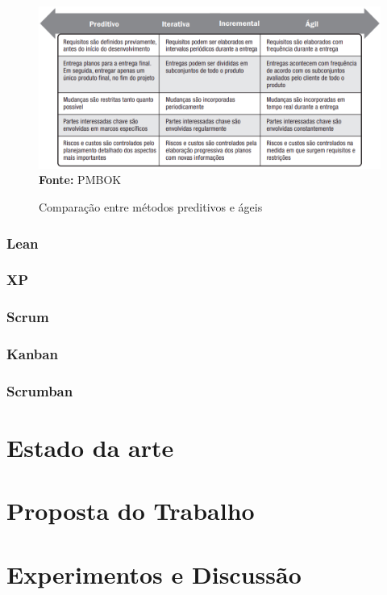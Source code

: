 \documentclass[
    12pt,       %
    openright,      %
    twoside,      %
    a4paper,      %
    english,      %
    french,       %
    spanish,      %
    brazil,       %
    ]{abntex2}
\begin{document}
\begin{figure}[h]
    \centering
    \caption{Comparação entre métodos preditivos e ágeis}
    \includegraphics[width=\textwidth]{src/tex/img/PreditivoAgilPMBOKpg666.png}
    \label{PreditivoAgilPMBOK}
    \textbf{Fonte:} PMBOK \cite{PMBOK:2017}
\end{figure}


\subsection{Lean}
\subsection{XP}
\subsection{Scrum}
\subsection{Kanban}
\subsection{Scrumban}

\chapter{Estado da arte}
\label{sec:EstadoArte}


\chapter{Proposta do Trabalho}
\label{sec:Proposta}


\chapter{Experimentos e Discussão}
\label{sec:Experimentos}
\end{document}
